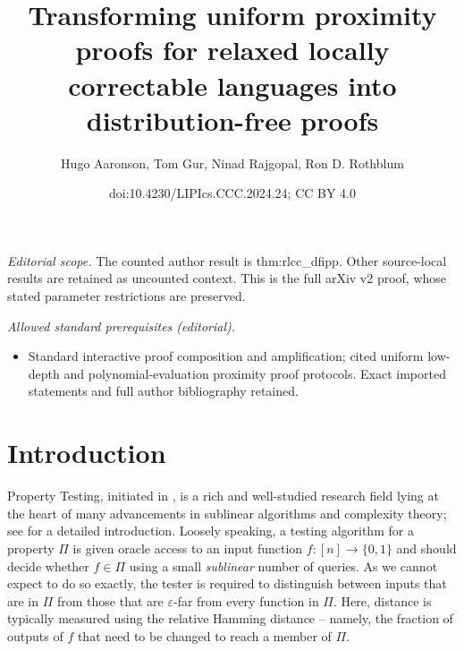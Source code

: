 \documentclass[10pt,a4paper]{article}
\title{Transforming uniform proximity proofs for relaxed locally correctable languages into distribution-free proofs}
\author{Hugo Aaronson, Tom Gur, Ninad Rajgopal, Ron D. Rothblum}
\date{doi:10.4230/LIPIcs.CCC.2024.24; CC BY 4.0}
\begin{document}
\maketitle
\setcounter{section}{1}
\noindent\textit{Editorial scope.} The counted author result is thm:rlcc\_dfipp. Other source-local results are retained as uncounted context. This is the full arXiv v2 proof, whose stated parameter restrictions are preserved.\par\medskip
\noindent\textit{Allowed standard prerequisites (editorial).}\begin{itemize}
\item Standard interactive proof composition and amplification; cited uniform low-depth and polynomial-evaluation proximity proof protocols. Exact imported statements and full author bibliography retained.
\end{itemize}\medskip
\section{Introduction}
Property Testing, initiated in \cite{RS96, GGR98}, is a rich and well-studied research field lying at the heart of many advancements in sublinear algorithms and complexity theory; see \cite{Gol17_book,BY22} for a detailed introduction. Loosely speaking, a testing algorithm for a property $\Pi$ is given oracle access to an input function $f:[n]\rightarrow\{0,1\}$ and should decide whether $f \in \Pi$ using a small \emph{sublinear} number of queries. As  we cannot expect to do so exactly, the tester is required to distinguish between inputs that are in $\Pi$ from those that are $\varepsilon$-far from every function in $\Pi$. Here, distance is typically measured using the relative Hamming distance -- namely, the fraction of outputs of $f$ that need to be changed to reach a member of $\Pi$.
\end{document}
